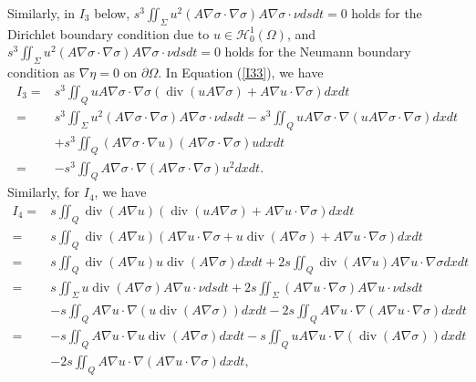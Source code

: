 \documentclass[9pt,reqno]{amsart}
\theoremstyle{plain}
\numberwithin{equation}{section}
\numberwithin{theorem}{section}
\DeclareMathOperator*{\Div}{\mathrm{div}}
\begin{document}
	Similarly, in $I_3$ below, $s^3 \iint_\Sigma u^2 (A \nabla \sigma \cdot \nabla \sigma) A \nabla \sigma \cdot \nu ds dt=0$ holds for the Dirichlet boundary condition due to $u \in \mathcal{H}_0^1(\Omega)$, and $s^3 \iint_\Sigma u^2 (A \nabla \sigma \cdot \nabla \sigma) A \nabla \sigma \cdot \nu ds dt=0$ holds for the Neumann boundary condition as $\nabla \eta=0$ on $\partial \Omega$.
	In Equation (\ref{I33}), we have
	\begin{equation}\label{I33}
		\begin{split}
			I_3  =&s^3 \iint_Q u A \nabla \sigma \cdot \nabla \sigma (\Div (u A \nabla \sigma) + A\nabla u \cdot \nabla \sigma ) dx  dt\\
			=&s^3 \iint_\Sigma u^2 (A \nabla \sigma \cdot \nabla \sigma) A \nabla \sigma \cdot \nu  ds dt -s^3 \iint_Q u A \nabla \sigma \cdot \nabla (u A \nabla \sigma \cdot \nabla \sigma  ) dx  dt\\
			&+ s^3 \iint_Q  (A \nabla \sigma \cdot \nabla u) ( A \nabla \sigma \cdot \nabla \sigma  ) u dx  dt\\
			=&-s^3\iint_Q  A\nabla \sigma \cdot \nabla ( A\nabla \sigma \cdot\nabla \sigma) u^2 dx  dt.
		\end{split}
	\end{equation}
	Similarly, for $I_4$, we have
	\begin{equation*}
		\begin{split}
			I_4= & s \iint_Q \Div(A \nabla u)\left(  \Div(u A \nabla \sigma)+ A \nabla u \cdot \nabla \sigma\right)  dx  dt \\%
			= & s \iint_Q \Div(A \nabla u)\left( A \nabla u \cdot \nabla \sigma+ u \Div(A \nabla \sigma)+ A \nabla u \cdot \nabla \sigma\right)  dx  dt \\%
			= & s \iint_Q \Div(A \nabla u) u \Div(A \nabla \sigma)dx  dt + 2s \iint_Q \Div(A \nabla u) A \nabla u \cdot \nabla \sigma   dx  dt \\%
			= & s \iint_\Sigma u \Div(A \nabla \sigma )A \nabla u \cdot \nu dsdt + 2s \iint_\Sigma  (A \nabla u \cdot \nabla \sigma) A \nabla u \cdot \nu ds dt \\%
			&-s \iint_Q A \nabla u \cdot  \nabla\left( u \Div(A \nabla \sigma)\right) dx  dt -2s \iint_{Q} A \nabla u\cdot \nabla \left( A \nabla u \cdot \nabla \sigma \right)  dx  dt \\%
			= &
			-s \iint_Q A \nabla u \cdot  \nabla u \Div(A \nabla \sigma)dx  dt-s \iint_Q u A \nabla u\cdot \nabla (\Div(A \nabla \sigma)) dx  dt\\%
			&-2s \iint_{Q} A \nabla u\cdot \nabla(A \nabla u \cdot \nabla \sigma)   dx  dt, 
		\end{split}
	\end{equation*}
\end{document}

